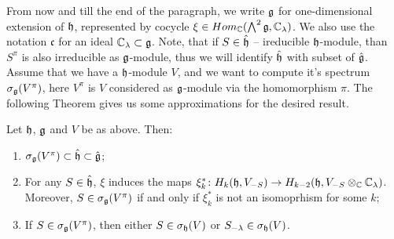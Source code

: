 From now and till the end of the paragraph, we write $\mathfrak{g}$ for one-dimensional extension of
$\mathfrak{h}$, represented by cocycle $\xi \in Hom_{\mathbb{C}}(\bigwedge^2\mathfrak{g}, \mathbb{C}_\lambda)$. We also use the
notation $\mathfrak{c}$ for an ideal $\mathbb{C}_\lambda\subset \mathfrak{g}$. Note, that if $S \in \hat{\mathfrak{h}}$ --
ireducible $\mathfrak{h}$-module, than $S^\pi$ is also irreducible as $\mathfrak{g}$-module, thus we will
identify $\hat{\mathfrak{h}}$ with subset of $\hat{\mathfrak{g}}$. Assume that we have a $\mathfrak{h}$-module $V$, and we
want to compute it's spectrum $\sigma_{\mathfrak{g}} (V^\pi)$, here $V^\pi$ is $V$ considered as
$\mathfrak{g}$-module via the homomorphism $\pi$. The following Theorem gives us some approximations for
the desired result.
\begin{theorem} \label{t:1ext}
    Let $\mathfrak{h}$, $\mathfrak{g}$ and $V$ be as above. Then:
    \begin{enumerate}
        \item $\sigma_{\mathfrak{g}}(V^\pi) \subset \hat{\mathfrak{h}} \subset \hat{\mathfrak{g}}$;

        \item For any $S \in \hat{\mathfrak{h}}$, $\xi$ induces the maps $\xi_k^* \colon H_k(\mathfrak{h}, V_{-S})
            \to H_{k - 2}(\mathfrak{h},  V_{-S}\otimes_{\mathbb{C}} \mathbb{C}_\lambda)$. Moreover, $S \in
            \sigma_{\mathfrak{g}}(V^\pi)$ if and only if $\xi^*_k$ is not an isomoprhism for some $k$;

        \item If $S\in \sigma_{\mathfrak{g}}(V^\pi)$, then either $S \in \sigma_{\mathfrak{h}}(V)$ or
            $S_{-\lambda}\in \sigma_{\mathfrak{h}}(V)$.
    \end{enumerate}
\end{theorem}
